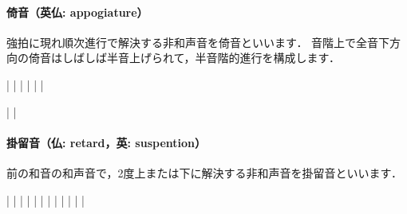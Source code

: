 \documentclass[dvipdfmx,uplatex,b5paper,openany,jbase=12Q,nomag*,textwidth-limit=44%
               ]{gachimuchi}[2020/05/05]
\begin{document}
\paragraph{倚音（英仏: appogiature）}
強拍に現れ順次進行で解決する非和声音を倚音といいます．
音階上で全音下方向の倚音はしばしば半音上げられて，半音階的進行を構成します．
\begin{Music}
  \generalmeter{\meterC}%
  \Startpiece%
  \NOTes%
  |\zchordsu{\Cross}%
  \en\doublebar%
  \NOTes%
  |\zchordsu{\Cross}%
  \en\doublebar%
  \NOTes%
  |\zchordsu{\Cross}%
  \en\doublebar%
  \NOTes%
  |\zchordsu{\Cross}%
  \en\doublebar%
  \NOTes%
  |\zchordsu{\Cross}%
  \en\doublebar%
  \NOTes%
  |\zchordsu{\Cross}%
  \en\setdoublebar%
  \endpiece%
\end{Music}
\begin{Music}[.6\linewidth]
  \generalmeter{\meterC}%
  \Startpiece%
  \NOtes%
  |%
  \en\doublebar%
  \NOtes%
  |%
  \en\setdoublebar%
  \endpiece%
\end{Music}

\paragraph{掛留音（仏: retard，英: suspention）}
前の和音の和声音で，2度上または下に解決する非和声音を掛留音といいます．
\begin{Music}
  \generalmeter{\meterC}%
  \Startpiece%
  \NOTes%
  |%
  \en\NOtes
  |%
  \en\doublebar%
  \NOTes%
  |%
  \en\NOtes
  |%
  \en\doublebar%
  \NOTes%
  |%
  \en\NOtes
  |%
  \en\doublebar%
  \NOTes%
  |%
  \en\NOtes
  |%
  \en\doublebar%
  \NOTes%
  |%
  \en\NOtes
  |%
  \en\doublebar%
  \NOTes%
  |%
  \en\NOtes
  |%
  \en\setdoublebar%
  \endpiece%
\end{Music}
\end{document}
